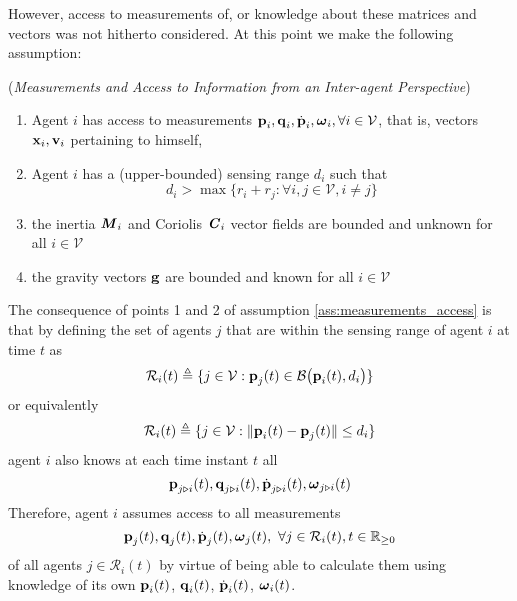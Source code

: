 
However, access to measurements of, or knowledge about these matrices and
vectors was not hitherto considered. At this point we make the following
assumption:\\[1ex]

\begin{gg_box}
  \begin{assumption} (\textit{Measurements and Access to Information
    from an Inter-agent Perspective})
  \label{ass:measurements_access}
  \begin{enumerate}

    \item Agent $i$ has access to measurements
      $\bm{\mathbf{p}}_i, \bm{\mathbf{q}}_i, \dot{\bm{\mathbf{p}}}_i, \bm{\mathbf{\omega}}_i, \forall i\in\mathcal{V}$,
      that is, vectors $\bm{\mathbf{x}}_i, \bm{\mathbf{v}}_i$ pertaining to himself,

    \item Agent $i$ has a (upper-bounded) sensing range $d_i$ such that
      $$d_i > \max\{r_i + r_j : \forall i,j \in \mathcal{V}, i \neq j\}$$

    \item the inertia $\bm{\mathit{M}}_i$ and Coriolis $\bm{\mathit{C}}_i$ vector fields are
      bounded and unknown for all $i \in \mathcal{V}$

    \item the gravity vectors $\bm{\mathbf{g}}$ are bounded and known for all $i \in \mathcal{V}$

  \end{enumerate}
\end{assumption}
\end{gg_box}

The consequence of points 1 and 2 of assumption \eqref{ass:measurements_access}
is that by defining the set of agents $j$ that are within the sensing range
of agent $i$ at time $t$ as
$$\mathcal{R}_i(t) \triangleq \{j\in\mathcal{V} : \bm{\mathbf{p}}_j(t)\in\mathcal{B}\big(\bm{\mathbf{p}}_i(t), d_i\big)\}$$
or equivalently
$$\mathcal{R}_i(t) \triangleq \{j\in\mathcal{V} : \| \bm{\mathbf{p}}_i(t) - \bm{\mathbf{p}}_j(t) \| \leq d_i\}$$
agent $i$ also knows at each time instant $t$ all
$$\bm{\mathbf{p}}_{j \triangleright i}(t), \bm{\mathbf{q}}_{j \triangleright i}(t),
\dot{\bm{\mathbf{p}}}_{j \triangleright i}(t), \bm{\mathbf{\omega}}_{j \triangleright i}(t)$$
Therefore, agent $i$ assumes access to all measurements
$$\bm{\mathbf{p}}_{j}(t), \bm{\mathbf{q}}_{j}(t), \dot{\bm{\mathbf{p}}}_j(t),
\bm{\mathbf{\omega}}_j(t),\ \forall j\in \mathcal{R}_i(t),t\in\mathbb{R}_{\geq 0}$$
of all agents $j \in \mathcal{R}_i(t)$ by virtue of being able to calculate
them using knowledge of its own
$\bm{\mathbf{p}}_i(t)$, $\bm{\mathbf{q}}_i(t)$, $\dot{\bm{\mathbf{p}}}_i(t)$, $\bm{\mathbf{\omega}}_i(t)$.


